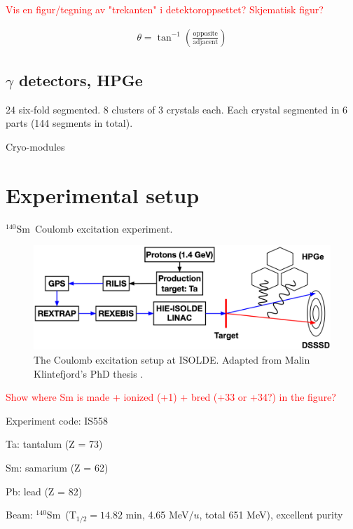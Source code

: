 \documentclass[twoside,english]{uiofysmaster/uiofysmaster}
\newcommand{\Sm}{$^{140}$Sm} %
\begin{document}
\textcolor{red}{Vis en figur/tegning av "trekanten" i detektoroppsettet? Skjematisk figur?} 

\begin{align*}
	\theta = \tan^{-1} \left( \frac{\text{opposite}}{\text{adjacent}} \right)
\end{align*}

\subsection{\texorpdfstring{$\gamma$}{Gamma} detectors, HPGe}

24 six-fold segmented. 8 clusters of 3 crystals each. Each crystal segmented in 6 parts (144 segments in total).

\bigskip

Cryo-modules

\section{Experimental setup}
\Sm ~Coulomb excitation experiment.

\begin{figure}[ht]
	\centering
	\includegraphics[width=\textwidth]{../Drawings/Coulex-ISOLDE.png}
	\caption{The Coulomb excitation setup at ISOLDE. Adapted from Malin Klintefjord's PhD thesis \cite{Klintefjord}.}
	\label{fig:Coulex}
\end{figure}

\textcolor{red}{Show where Sm is made + ionized (+1) + bred (+33 or +34?) in the figure?}

\bigskip

Experiment code: IS558 

Ta: tantalum (Z = 73)

Sm: samarium (Z = 62)

Pb: lead (Z = 82) \newline



Beam: \Sm ~(T$_{1/2} = 14.82$ min, 4.65 MeV/$u$, total 651 MeV), excellent purity
\end{document}
